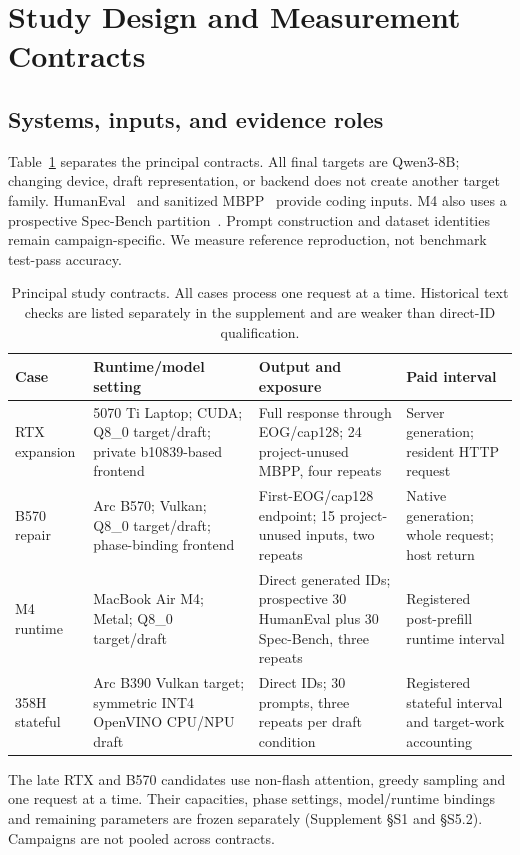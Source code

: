\section{Study Design and Measurement Contracts}
\label{sec:methods}
\subsection{Systems, inputs, and evidence roles}
Table~\ref{tab:contracts} separates the principal contracts. All final targets are Qwen3-8B; changing device, draft representation, or backend does not create another target family. HumanEval~\cite{humaneval} and sanitized MBPP~\cite{mbpp} provide coding inputs. M4 also uses a prospective Spec-Bench partition~\cite{specbench}. Prompt construction and dataset identities remain campaign-specific. We measure reference reproduction, not benchmark test-pass accuracy.

\begin{table}[t]\centering\small
\caption{Principal study contracts. All cases process one request at a time. Historical text checks are listed separately in the supplement and are weaker than direct-ID qualification.}
\label{tab:contracts}
\begin{tabularx}{\linewidth}{@{}p{.17\linewidth}p{.26\linewidth}XX@{}}\toprule
Case & Runtime/model setting & Output and exposure & Paid interval\\\midrule
RTX expansion & 5070 Ti Laptop; CUDA; Q8\_0 target/draft; private b10839-based frontend & Full response through EOG/cap128; 24 project-unused MBPP, four repeats & Server generation; resident HTTP request\\
B570 repair & Arc B570; Vulkan; Q8\_0 target/draft; phase-binding frontend & First-EOG/cap128 endpoint; 15 project-unused inputs, two repeats & Native generation; whole request; host return\\
M4 runtime & MacBook Air M4; Metal; Q8\_0 target/draft & Direct generated IDs; prospective 30 HumanEval plus 30 Spec-Bench, three repeats & Registered post-prefill runtime interval\\
358H stateful & Arc B390 Vulkan target; symmetric INT4 OpenVINO CPU/NPU draft & Direct IDs; 30 prompts, three repeats per draft condition & Registered stateful interval and target-work accounting\\\bottomrule
\end{tabularx}
\end{table}

The late RTX and B570 candidates use non-flash attention, greedy sampling and one request at a time. Their capacities, phase settings, model/runtime bindings and remaining parameters are frozen separately (Supplement \S S1 and \S S5.2). Campaigns are not pooled across contracts.

